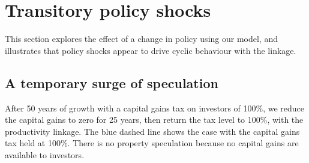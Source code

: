 \newpage
\section{Transitory policy shocks}

This section explores the effect of a change in policy using our model, and illustrates that policy shocks appear to drive cyclic behaviour with the linkage.

\subsection{A temporary surge of speculation}
After 50 years of growth with a capital gains tax on investors of 100\%, we reduce the capital gains to zero for 25 years, then return the tax level to 100\%, with the productivity linkage. The blue dashed line shows the case with the capital gains tax held at 100\%. There is no property speculation because no capital gains are available to investors.
